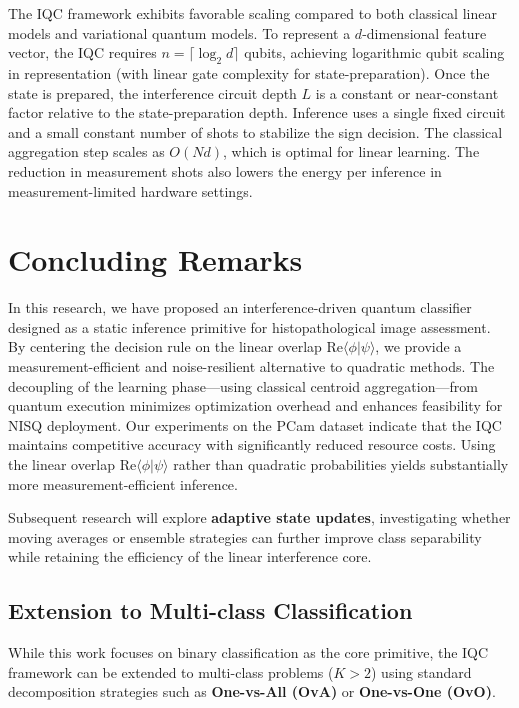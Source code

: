 \documentclass[conference]{IEEEtran}
\begin{document}
The IQC framework exhibits favorable scaling compared to both classical linear models and variational quantum models. To represent a $d$-dimensional feature vector, the IQC requires $n = \lceil \log_2 d \rceil$ qubits, achieving logarithmic qubit scaling in representation (with linear gate complexity for state-preparation). Once the state is prepared, the interference circuit depth $L$ is a constant or near-constant factor relative to the state-preparation depth. Inference uses a single fixed circuit and a small constant number of shots to stabilize the sign decision. The classical aggregation step scales as $O(Nd)$, which is optimal for linear learning. The reduction in measurement shots also lowers the energy per inference in measurement-limited hardware settings.

\section{Concluding Remarks}
In this research, we have proposed an interference-driven quantum classifier designed as a static inference primitive for histopathological image assessment. By centering the decision rule on the linear overlap $\mathrm{Re}\langle \phi | \psi \rangle$, we provide a measurement-efficient and noise-resilient alternative to quadratic methods. The decoupling of the learning phase—using classical centroid aggregation—from quantum execution minimizes optimization overhead and enhances feasibility for NISQ deployment. Our experiments on the PCam dataset indicate that the IQC maintains competitive accuracy with significantly reduced resource costs. Using the linear overlap $\mathrm{Re}\langle \phi | \psi \rangle$ rather than quadratic probabilities yields substantially more measurement-efficient inference.

Subsequent research will explore \textbf{adaptive state updates}, investigating whether moving averages or ensemble strategies can further improve class separability while retaining the efficiency of the linear interference core.

\subsection{Extension to Multi-class Classification}
While this work focuses on binary classification as the core primitive, the IQC framework can be extended to multi-class problems ($K > 2$) using standard decomposition strategies such as \textbf{One-vs-All (OvA)} or \textbf{One-vs-One (OvO)}.
\end{document}
